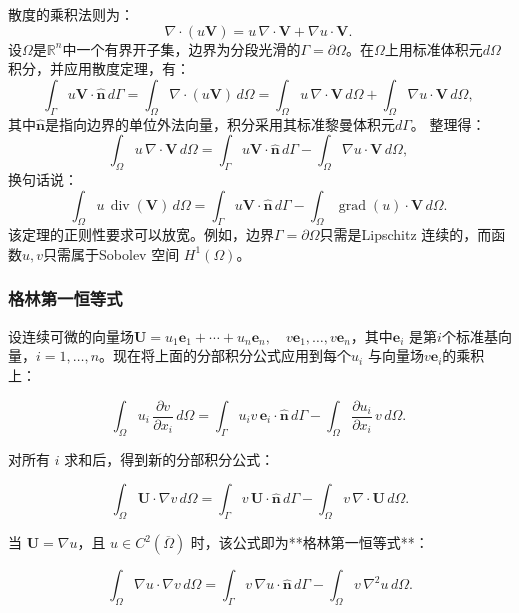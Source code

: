 散度的乘积法则为：
$$
\nabla \cdot (u\mathbf{V}) = u\,\nabla \cdot \mathbf{V} + \nabla u \cdot \mathbf{V}.~
$$
设$\Omega$是$\mathbb{R}^n$中一个有界开子集，边界为分段光滑的$\Gamma = \partial \Omega$。在$\Omega$上用标准体积元$d\Omega$积分，并应用散度定理，有：
$$
\int_{\Gamma} u\mathbf{V} \cdot \hat{\mathbf{n}}\,d\Gamma 
= \int_{\Omega} \nabla \cdot (u\mathbf{V})\,d\Omega
= \int_{\Omega} u\,\nabla \cdot \mathbf{V}\,d\Omega + \int_{\Omega} \nabla u \cdot \mathbf{V}\,d\Omega,~
$$
其中$\hat{\mathbf{n}}$是指向边界的单位外法向量，积分采用其标准黎曼体积元$d\Gamma$。
整理得：
$$
\int_{\Omega} u\,\nabla \cdot \mathbf{V}\,d\Omega 
= \int_{\Gamma} u\mathbf{V}\cdot \hat{\mathbf{n}}\,d\Gamma - \int_{\Omega} \nabla u \cdot \mathbf{V}\,d\Omega,~
$$
换句话说：
$$
\int_{\Omega} u\,\operatorname{div}(\mathbf{V})\,d\Omega
= \int_{\Gamma} u\mathbf{V}\cdot \hat{\mathbf{n}}\,d\Gamma - \int_{\Omega} \operatorname{grad}(u)\cdot \mathbf{V}\,d\Omega.~
$$
该定理的正则性要求可以放宽。例如，边界$\Gamma = \partial \Omega$只需是Lipschitz 连续的，而函数$u, v$只需属于Sobolev 空间 $H^{1}(\Omega)$。
\subsubsection{格林第一恒等式}
设连续可微的向量场$\mathbf{U} = u_{1}\mathbf{e}_{1} + \cdots + u_{n}\mathbf{e}_{n},\quad v\mathbf{e}_{1}, \ldots, v\mathbf{e}_{n}$，其中$\mathbf{e}_{i}$ 是第$i$个标准基向量，$i = 1, \ldots, n$。现在将上面的分部积分公式应用到每个$u_{i}$ 与向量场$v\mathbf{e}_{i}$的乘积上：

$$
\int_{\Omega} u_{i}\,\frac{\partial v}{\partial x_{i}}\,d\Omega
= \int_{\Gamma} u_{i}v\,\mathbf{e}_{i}\cdot \hat{\mathbf{n}}\,d\Gamma
- \int_{\Omega} \frac{\partial u_{i}}{\partial x_{i}}\,v\,d\Omega.~
$$

对所有 $i$ 求和后，得到新的分部积分公式：

$$
\int_{\Omega} \mathbf{U}\cdot \nabla v\,d\Omega
= \int_{\Gamma} v\,\mathbf{U}\cdot \hat{\mathbf{n}}\,d\Gamma
- \int_{\Omega} v\,\nabla \cdot \mathbf{U}\,d\Omega.
$$

当 $\mathbf{U} = \nabla u$，且 $u \in C^{2}(\overline{\Omega})$ 时，该公式即为**格林第一恒等式**：

$$
\int_{\Omega} \nabla u \cdot \nabla v\,d\Omega
= \int_{\Gamma} v\,\nabla u \cdot \hat{\mathbf{n}}\,d\Gamma
- \int_{\Omega} v\,\nabla^{2}u\,d\Omega.
$$

